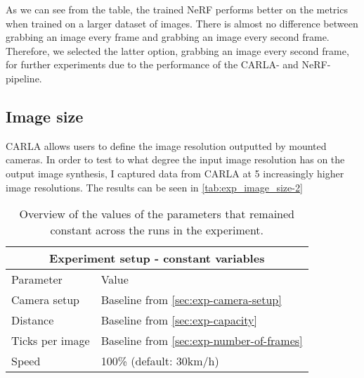 As we can see from the table, the trained NeRF performs better on the metrics when trained on a larger dataset of images. There is almost no difference between grabbing an image every frame and grabbing an image every second frame. Therefore, we selected the latter option, grabbing an image every second frame, for further experiments due to the performance of the CARLA- and NeRF-pipeline.

























\subsection{Image size} \label{sec:exp-image-resolution}
CARLA allows users to define the image resolution outputted by mounted cameras. In order to test to what degree the input image resolution has on the output image synthesis, I captured data from CARLA at 5 increasingly higher image resolutions. The results can be seen in \autoref{tab:exp_image_size-2}

\begin{table}[ht]
\centering
\setlength{\tabcolsep}{12pt}
\renewcommand{\arraystretch}{1.2}
\begin{tabular}{l l}
\multicolumn{2}{c}{\textbf{Experiment setup - constant variables}} \\
\hline
Parameter & Value \\
\hline
\cellcolor{blue}Camera setup &\cellcolor{blue}Baseline from \autoref{sec:exp-camera-setup} \\
\cellcolor{blue}Distance &\cellcolor{blue}Baseline from \autoref{sec:exp-capacity} \\
\cellcolor{blue}Ticks per image &\cellcolor{blue}Baseline from \autoref{sec:exp-number-of-frames} \\
Speed & 100\% (default: 30km/h) \\
\hline
\end{tabular}
\caption{Overview of the values of the parameters that remained constant across the runs in the experiment.}
\label{tab:exp-image-resolution-stable-variables}
\end{table}

